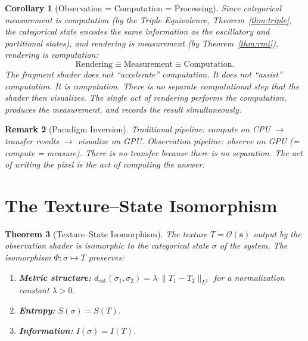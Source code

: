 \documentclass[11pt,twocolumn,a4paper]{article}
\newtheorem{theorem}{Theorem}[section]
\newtheorem{corollary}[theorem]{Corollary}
\newtheorem{remark}[theorem]{Remark}
\newcommand{\Obs}{\mathcal{O}}
\newcommand{\dcat}{d_{\mathrm{cat}}}
\begin{document}

\begin{corollary}[Observation = Computation = Processing]
\label{cor:obs-comp}
Since categorical measurement \emph{is} computation (by the Triple
Equivalence, Theorem~\ref{thm:triple}, the categorical state encodes
the same information as the oscillatory and partitional states), and
rendering \emph{is} measurement (by Theorem~\ref{thm:rmi}), rendering
\emph{is} computation:
\begin{equation}
\text{Rendering} \equiv \text{Measurement}
  \equiv \text{Computation}.
\label{eq:triple-identity}
\end{equation}
The fragment shader does not ``accelerate'' computation.  It does not
``assist'' computation.  It \emph{is} computation.  There is no
separate computational step that the shader then visualizes.  The
single act of rendering performs the computation, produces the
measurement, and records the result simultaneously.
\end{corollary}

\begin{remark}[Paradigm Inversion]
Traditional pipeline: compute on CPU $\to$ transfer results $\to$
visualize on GPU. Observation pipeline: observe on GPU (= compute
= measure). There is no transfer because there is no separation.
The act of writing the pixel \emph{is} the act of computing the
answer.
\end{remark}


\section{The Texture--State Isomorphism}
\label{sec:texture-state}

\begin{theorem}[Texture--State Isomorphism]
\label{thm:texture-state}
The texture $T = \Obs(\bm{s})$ output by the observation shader is
isomorphic to the categorical state $\sigma$ of the system. The
isomorphism $\Phi : \sigma \mapsto T$ preserves:
\begin{enumerate}[label=(\roman*),leftmargin=*]
\item \textbf{Metric structure:}
  $\dcat(\sigma_1, \sigma_2)
  = \lambda \cdot \|T_1 - T_2\|_{L^2}$
  for a normalization constant $\lambda > 0$.
\item \textbf{Entropy:} $S(\sigma) = S(T)$.
\item \textbf{Information:} $I(\sigma) = I(T)$.
\end{enumerate}
\end{theorem}
\end{document}
